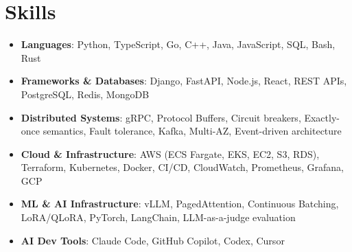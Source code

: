 \documentclass[letterpaper,11pt]{article}
\newcommand{\resumeSubHeadingListStart}{\begin{itemize}[leftmargin=0.15in, label={}]}
\newcommand{\resumeSubHeadingListEnd}{\end{itemize}}
\newcommand{\resumeSkillHeading}[2]{%
  \item\small{\textbf{#1}: #2 \vspace{-9pt}}%
}
\begin{document}
\section{Skills}
  \resumeSubHeadingListStart
    \resumeSkillHeading{Languages}{Python, TypeScript, Go, C++, Java, JavaScript, SQL, Bash, Rust}
    \resumeSkillHeading{Frameworks \& Databases}{Django, FastAPI, Node.js, React, REST APIs, PostgreSQL, Redis, MongoDB}
    \resumeSkillHeading{Distributed Systems}{gRPC, Protocol Buffers, Circuit breakers, Exactly-once semantics, Fault tolerance, Kafka, Multi-AZ, Event-driven architecture}
    \resumeSkillHeading{Cloud \& Infrastructure}{AWS (ECS Fargate, EKS, EC2, S3, RDS), Terraform, Kubernetes, Docker, CI/CD, CloudWatch, Prometheus, Grafana, GCP}
    \resumeSkillHeading{ML \& AI Infrastructure}{vLLM, PagedAttention, Continuous Batching, LoRA/QLoRA, PyTorch, LangChain, LLM-as-a-judge evaluation}
    \resumeSkillHeading{AI Dev Tools}{Claude Code, GitHub Copilot, Codex, Cursor}
  \resumeSubHeadingListEnd
\end{document}
